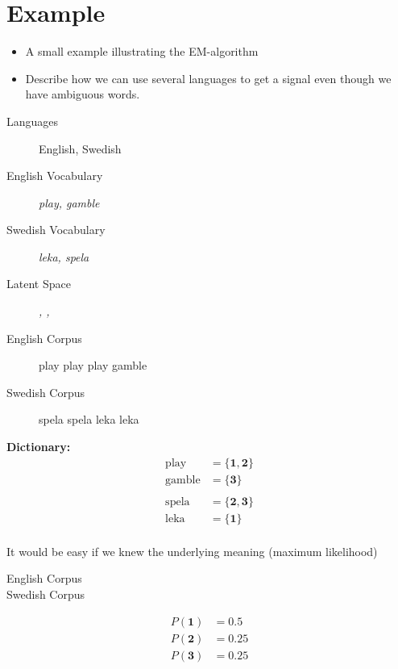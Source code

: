 
\section{Example}
\begin{itemize}
    \item A small example illustrating the EM-algorithm
    \item Describe how we can use several languages to get a signal even though we have ambiguous words.
\end{itemize}
\begin{description}
\item[Languages] English, Swedish
\item[English Vocabulary] \emph{play, gamble}
\item[Swedish Vocabulary] \emph{leka, spela}
\item[Latent Space] \emph{, , }

\item[English Corpus] play play play gamble
\item[Swedish Corpus] spela spela leka leka
\end{description}

\textbf{Dictionary:}
\begin{align*}
\text{play} &= \{\mathbf{1}, \mathbf{2} \} \\
\text{gamble} &= \{ \mathbf{3} \} \\ \\
\text{spela} &= \{ \mathbf{2}, \mathbf{3} \} \\
\text{leka} &= \{ \mathbf{1} \} \\
\end{align*}

It would be easy if we knew the underlying meaning
(maximum likelihood)
\begin{description}
\item[English Corpus]     
\item[Swedish Corpus]    
\end{description}


\begin{align*}
    P(\mathbf{1}) &= 0.5 \\
    P(\mathbf{2}) &= 0.25  \\
    P(\mathbf{3}) &= 0.25 \\
\end{align*}
